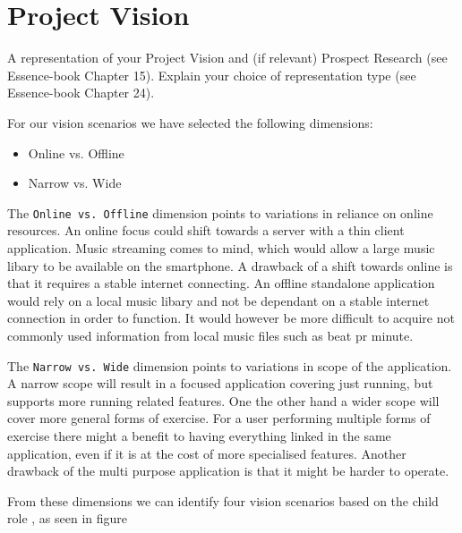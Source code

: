 \section{Project Vision}
A representation of your Project Vision and (if relevant) Prospect Research (see Essence-book Chapter 15).
Explain your choice of representation type (see Essence-book Chapter 24).

For our vision scenarios \cite[ p. 127]{essence} we have selected the following dimensions:
\begin{itemize}
\item Online vs. Offline %
\item Narrow vs. Wide
\end{itemize}

The \texttt{Online vs. Offline} dimension points to variations in reliance on online resources. An online focus could shift  towards a server with a thin client application. Music streaming comes to mind, which would allow a large music libary to be available on the smartphone. A drawback of a shift towards online is that it requires a stable internet connecting. An offline standalone application would rely on a local music libary and not be dependant on a stable internet connection in order to function. It would however be more difficult to acquire not commonly used information from local music files such as beat pr minute.


The \texttt{Narrow vs. Wide} dimension points to variations in scope of the application. A narrow scope will result in a focused application covering just running, but supports more running related features. One the other hand a wider scope will cover more general forms of exercise. For a user performing multiple forms of exercise there might a benefit to having everything linked in the same application, even if it is at the cost of more specialised features. Another drawback of the multi purpose application is that it might be harder to operate.



From these dimensions we can identify four vision scenarios based on the child role  \cite[ pp. 132-134]{essence}, as seen in figure 


